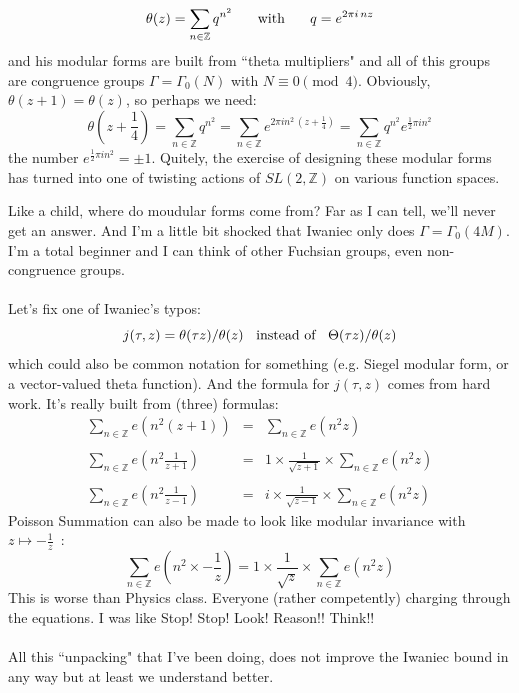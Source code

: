 \documentclass[12pt]{article}
\begin{document}
$$  \theta(z) = \sum_{n \in \mathbb{Z}} q^{n^2} \hspace{0.25in}\text{with}\hspace{0.25in} q = e^{2\pi i \, n z}$$
and his modular forms are built from ``theta multipliers" and all of this groups are congruence groups $\Gamma = \Gamma_0(N)$ with $N \equiv 0 \pmod 4$.  Obviously, $\theta(z+1) = \theta(z)$, so perhaps we need:
$$ \theta(z + \frac{1}{4}) = \sum_{n \in \mathbb{Z}} q^{n^2}
= \sum_{n \in \mathbb{Z}} e^{2\pi i n^2 \, (z + \frac{1}{4})} 
= \sum_{n \in \mathbb{Z}} q^{n^2}
e^{\frac{1}{2}\pi i n^2 } $$
the number $e^{\frac{1}{2}\pi i n^2 } = \pm 1$.  Quitely, the exercise of designing these modular forms has turned into one of twisting actions of $SL(2, \mathbb{Z})$ on various function spaces. 

\newpage

\noindent Like a child, where do moudular forms come from? Far as I can tell, we'll never get an answer.  And I'm a little bit shocked that Iwaniec only does $\Gamma = \Gamma_0(4M)$.  I'm a total beginner and I can think of other Fuchsian groups, even non-congruence groups.  \\ \\ 
Let's fix one of Iwaniec's typos:
$$ j(\tau, z) = \theta(\tau z) / \theta(z) \hspace{0.125in}\text{instead of}\hspace{0.125in}
\Theta(\tau z) / \theta(z) $$
which could also be common notation for something (e.g. Siegel modular form, or a vector-valued theta function).  And the formula for $j(\tau, z)$ comes from hard work.  It's really built from (three) formulas:
\begin{eqnarray*}
\sum_{n \in \mathbb{Z}} e(n^2 (z+1) ) &=& \sum_{n \in \mathbb{Z}} e(n^2 z ) \\ \\
\sum_{n \in \mathbb{Z}} e(n^2 \frac{1}{z+1} ) &=& 1 \times \frac{1}{\sqrt{z+1}} \times \sum_{n \in \mathbb{Z}} e(n^2 z ) \\ \\
\sum_{n \in \mathbb{Z}} e(n^2 \frac{1}{z-1} ) &=& i \times \frac{1}{\sqrt{z-1}} \times \sum_{n \in \mathbb{Z}} e(n^2 z )
\end{eqnarray*}
Poisson Summation can also be made to look like modular invariance with $z \mapsto - \frac{1}{z} $ \,:
$$ \sum_{n \in \mathbb{Z}} e(n^2 \times - \frac{1}{z} ) = 1 \times \frac{1}{\sqrt{z}} \times \sum_{n \in \mathbb{Z}} e(n^2 z ) $$ 
This is worse than Physics class.  Everyone (rather competently) charging through the equations.  I was like Stop! Stop! Look! Reason!! Think!! \\ \\
All this ``unpacking" that I've been doing, does not improve the Iwaniec bound in any way but at least we understand better.
\end{document}
